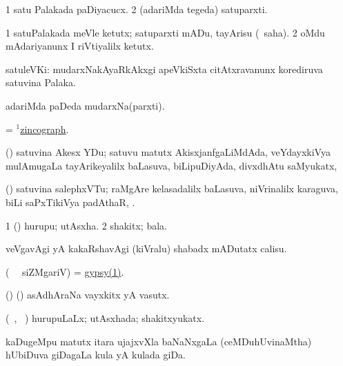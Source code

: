 \bentry
{} 
\gl{\nA} 
\bmng
\bnum
\num{1} satu Palakada paDiyacucx. 
\num{2} (adariMda tegeda) satuparxti.
\enum
\emng
\eentry

\bentry 
{} 
\gl{\sakirx} 
\bmng
\bnum
\num{1} satuPalakada meVle ketutx; satuparxti mADu, tayArisu (\akirx\ saha). 
\num{2} oMdu mAdariyanunx I riVtiyalilx ketutx.
\enum
\emng
\eentry

\bentry
{} 
\gl{\nA} 
\bmng
satuleVKi: 
\banum
{} mudarxNakAyaRkAkxgi apeVkiSxta citAtxravanunx korediruva satuvina Palaka. 

 adariMda paDeda mudarxNa(parxti).
\eanum
\emng 
\eentry

\bentry
{} 
\gl{\nA} 
\bmng
= \hyperlink{zincograph(1)}{$^1$zincograph}.
\emng
\eentry

\bentry
{}  
\gl{\nA} 
\bmng
(\ravi) satuvina Akesx YDu; satuvu matutx AkisxjanfgaLiMdAda, veYdayxkiVya mulAmugaLa tayArikeyalilx baLasuva, biLipuDiyAda, divxdhAtu saMyukatx, 
\emng
\eentry

\bentry
{}  
\gl{\nA}  
\bmng
(\ravi) satuvina salephxVTu; raMgAre kelasadalilx baLasuva, niVrinalilx karaguva, biLi saPxTikiVya padAthaR, .
\emng
\eentry

\bentry
{} 
\gl{\nA}
\bmng
\bnum
\num{1} (\AmA) hurupu; utAsxha. 
\num{2} shakitx; bala.
\enum
\emng
\eentry

\bentry
{} 
\gl{\akirx} 
\bmng
veVgavAgi yA kakaRshavAgi (kiVralu) shabadx mADutatx calisu.
\emng
\eentry

\bentry
{} 
\gl{\nA} 
\bmng
(\bava\  \ucAcx\ siZMgariV)
= \hyperref{kandict_g.pdf}{G}{gypsy(1)}{gypsy(1)}.
\emng
\eentry

\bentry
{} 
\gl{\nA}  
\bmng
(\ame) (\ashi) asAdhAraNa vayxkitx yA vasutx.
\emng
\eentry

\bentry
{} 
\gl{\gu} 
\bmng
(\tara\ , \tama\ )
hurupuLaLx; utAsxhada; shakitxyukatx.
\emng
\eentry

\bentry
{} 
\gl{\nA} 
\bmng
kaDugeMpu matutx itara ujajxvXla baNaNxgaLa (ceMDuhUvinaMtha) hUbiDuva  giDagaLa kula yA kulada giDa.
\emng
\eentry

